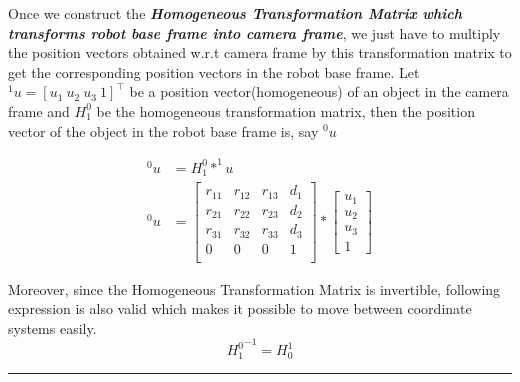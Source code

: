 \documentclass[a4paper,11pt]{article}%
\begin{document}
Once we construct the \textbf{\textit{Homogeneous Transformation Matrix which transforms robot base frame  into camera frame}}, we just have to multiply the position vectors obtained w.r.t camera frame by this transformation matrix to get the corresponding position vectors in the robot base frame. Let  $^1u = [u_1 ~u_2~ u_3~1]^\top$ be a  position vector(homogeneous) of an object in the camera frame and  $H^{0}_{1}$ be the homogeneous transformation matrix, then the position vector of the object in the robot base frame is\cite{tfs3}, say $^0u$

\begin{equation}
	\begin{split}
		^0u &= H^{0}_{1}* ^1u\\
		^0u &=
		{\begin{bmatrix}
			r_{11} & r_{12} & r_{13} & d_1 \\
			r_{21} & r_{22} & r_{23} & d_2 \\
			r_{31} & r_{32} & r_{33} & d_3 \\
			0 & 0 & 0 &1 \\
		\end{bmatrix}} * \begin{bmatrix} u_1 \\u_2\\ u_3\\1 \end{bmatrix}
	\end{split}
\end{equation}

Moreover, since the Homogeneous Transformation Matrix is invertible, following expression is also valid which makes it possible to move between coordinate systems easily.
\begin{equation}
{H^{0}_{1}}^{-1} = H^{1}_{0}
\end{equation}

\vfill
\vspace{1cm}
\hrule

\scriptsize
\begin{flushleft}
	

\end{flushleft}
\end{document}
